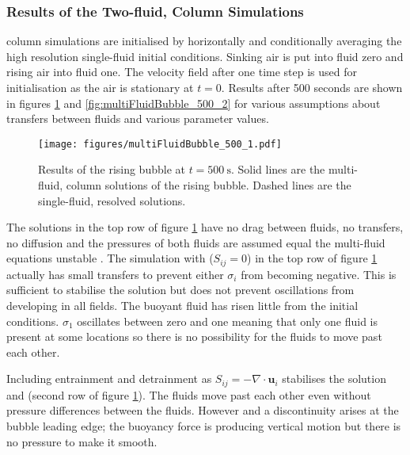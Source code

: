 \documentclass[draft]{agujournal2019}
\begin{document}
\subsubsection{Results of the Two-fluid,  Column Simulations}

 column simulations are initialised by horizontally
and conditionally averaging the high resolution single-fluid initial
conditions. Sinking air is put into fluid zero and rising air into
fluid one. The velocity field after one time step is used for initialisation
as the air is stationary at $t=0$. Results after 500 seconds are shown in figures \ref{fig:multiFluidBubble_500_1}
and \ref{fig:multiFluidBubble_500_2} for various assumptions about
transfers between fluids and various parameter values.

\begin{figure}
\noindent
\texttt{[image: figures/multiFluidBubble\_500\_1.pdf]}
\caption{\label{fig:multiFluidBubble_500_1} Results of the rising bubble at $t=500\ \text{s}$. Solid lines are the multi-fluid,  column solutions of the rising bubble. Dashed lines are the single-fluid, resolved solutions.}
\end{figure}

{The solutions in the top row of figure {\protect\ref{fig:multiFluidBubble_500_1}} have}
no drag between fluids, no transfers, no diffusion and
the pressures of both fluids are assumed equal  the multi-fluid
equations  unstable \cite{TEB19}. The simulation with ($S_{ij}=0$)
in the top row of figure \ref{fig:multiFluidBubble_500_1} actually
has small transfers to prevent either $\sigma_{i}$ from becoming
negative. This is sufficient to stabilise the solution but does not
prevent oscillations from developing in all fields. The buoyant fluid
has risen little from the initial conditions. $\sigma_1$ oscillates
between zero and one meaning that only one fluid is present at some
locations so there is no possibility for the fluids to move past each
other.

Including entrainment and detrainment as $S_{ij}=-\nabla\cdot\mathbf{u}_{i}$ stabilises the solution and
 (second row of
figure \ref{fig:multiFluidBubble_500_1}).
The fluids move  past each other
even without pressure differences between the fluids. However 
and a discontinuity arises at the bubble leading edge; the buoyancy force is producing vertical motion but there is no pressure to make it smooth. 
\end{document}
